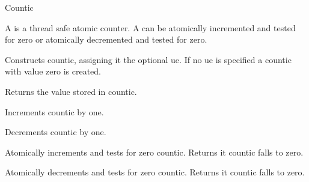 
\begin{classpage}{Countic}

A  is a thread safe atomic counter.
A  can be atomically incremented and tested for zero or atomically decremented and tested for zero.


\begin{mandescription}
  Constructs  countic, assigning it the optional ue.
  If no ue is specified a countic with value zero is created.
  
  Returns the value stored in  countic.
  
  Increments  countic by one.
  
  Decrements  countic by one.
  
  Atomically increments and tests for zero  countic.
  Returns  it  countic falls to zero.
  
  Atomically decrements and tests for zero  countic.
  Returns  it  countic falls to zero.
\end{mandescription}

\end{classpage}

